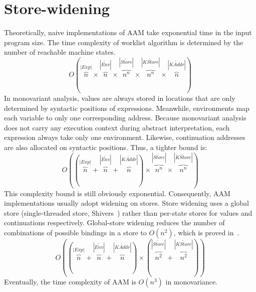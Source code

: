 \documentclass[12pt]{report}
\begin{document}
\section{Store-widening}
\label{sub:Store-widenning}
Theoretically, naive implementations of AAM take exponential time in the input program size.
The time complexity of worklist algorithm is determined by the number of reachable machine states.
\[
O(
\overbrace{n}^{|Exp|} \times \overbrace{n}^{|\widetilde{Env}|} \times \overbrace{n^n}^{|\widetilde{Store}|}
\times \overbrace{n^n}^{|\widetilde{KStore}|} \times \overbrace{n}^{|\widetilde{KAddr}|}
)
\]
In monovariant analysis, values are always stored in locations that are only determined by syntactic positions of expressions.
Meanwhile, environments map each variable to only one corresponding address.
Because monovariant analysis does not carry any execution context during abstract interpretation, each expression always take only one environment.
Likewise, continuation addresses are also allocated on syntactic positions.
Thus, a tighter bound is:
\[
O(
(\overbrace{n}^{|Exp|} + \overbrace{n}^{|\widetilde{Env}|} +  \overbrace{n}^{|\widetilde{KAddr}|}) \times \overbrace{n^n}^{|\widetilde{Store}|} \times \overbrace{n^n}^{|\widetilde{KStore}|}
)
\]
This complexity bound is still obviously exponential.
Consequently, AAM implementations usually adopt widening on stores.
Store widening uses a global store (single-threaded store, Shivers~\cite{shivers1991control}) rather than per-state stores for values and continuations respectively.
Global-store widening reduces the number of combinations of possible bindings in a store to $O(n^2)$,
which is proved in~\cite{van2010abstracting, gilray2016pushdown}.
\[
O(
(\overbrace{n}^{|Exp|} + \overbrace{n}^{|\widetilde{Env}|} +  \overbrace{n}^{|\widetilde{KAddr}|}) \times (\overbrace{n^2}^{|\widetilde{Store}|} + \overbrace{n^2}^{|\widetilde{KStore}|})
)
\]
Eventually, the time complexity of AAM is $O(n^3)$ in monovariance.
\end{document}
